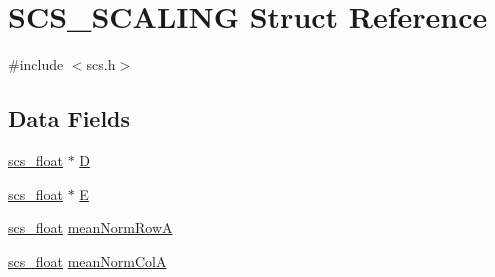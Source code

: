 \hypertarget{struct_s_c_s___s_c_a_l_i_n_g}{\section{S\-C\-S\-\_\-\-S\-C\-A\-L\-I\-N\-G Struct Reference}
\label{struct_s_c_s___s_c_a_l_i_n_g}
}


{\ttfamily \#include $<$scs.\-h$>$}

\subsection*{Data Fields}
\begin{DoxyCompactItemize}
\item 
\hyperlink{glbopts_8h_ad37836e6404bb2c3ae8adcc6290699b9}{scs\-\_\-float} $\ast$ \hyperlink{struct_s_c_s___s_c_a_l_i_n_g_a91a5c44c2e48a8d6025f44ab90daedc9}{D}
\item 
\hyperlink{glbopts_8h_ad37836e6404bb2c3ae8adcc6290699b9}{scs\-\_\-float} $\ast$ \hyperlink{struct_s_c_s___s_c_a_l_i_n_g_ac14d067614937adf6d7ad9925129405c}{E}
\item 
\hyperlink{glbopts_8h_ad37836e6404bb2c3ae8adcc6290699b9}{scs\-\_\-float} \hyperlink{struct_s_c_s___s_c_a_l_i_n_g_a875081f04d7673908463c20387e655ad}{mean\-Norm\-Row\-A}
\item 
\hyperlink{glbopts_8h_ad37836e6404bb2c3ae8adcc6290699b9}{scs\-\_\-float} \hyperlink{struct_s_c_s___s_c_a_l_i_n_g_ac9dbd3395f9fdafa716dc81b6b4eb68e}{mean\-Norm\-Col\-A}
\end{DoxyCompactItemize}


